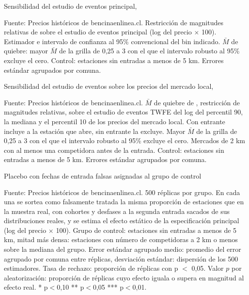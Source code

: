 \begin{table}[htbp]
    \centering
    \caption{Sensibilidad del estudio de eventos principal, \textcite{RAMBACHAN2023}} \label{tab:honest_principal}
    
    \caption*{\footnotesize Fuente: Precios históricos de bencinaenlinea.cl. Restricción de magnitudes relativas de \textcite{RAMBACHAN2023} sobre el estudio de eventos principal (log del precio $\times$ 100). Estimador e intervalo de confianza al 95\% convencional del bin indicado. $\bar{M}$ de quiebre: mayor $\bar{M}$ de la grilla de 0,25 a 3 con el que el intervalo robusto al 95\% excluye el cero. Control: estaciones sin entradas a menos de 5 km. Errores estándar agrupados por comuna.}
\end{table}

\begin{table}[htbp]
    \centering
    \caption{Sensibilidad del estudio de eventos sobre los precios del mercado local, \textcite{RAMBACHAN2023}} \label{tab:honest_mercado}
    \ajustar{}
    \caption*{\footnotesize Fuente: Precios históricos de bencinaenlinea.cl. $\bar{M}$ de quiebre de \textcite{RAMBACHAN2023}, restricción de magnitudes relativas, sobre el estudio de eventos TWFE del log del percentil 90, la mediana y el percentil 10 de los precios del mercado local. Con entrante incluye a la estación que abre, sin entrante la excluye. Mayor $\bar{M}$ de la grilla de 0,25 a 3 con el que el intervalo robusto al 95\% excluye el cero. Mercados de 2 km con al menos una competidora antes de la entrada. Control: estaciones sin entradas a menos de 5 km. Errores estándar agrupados por comuna.}
\end{table}

\begin{table}[htbp]
    \centering
    \caption{Placebo con fechas de entrada falsas asignadas al grupo de control} \label{tab:placebo_controles}
    \ajustar{}
    \caption*{\footnotesize Fuente: Precios históricos de bencinaenlinea.cl. 500 réplicas por grupo. En cada una se sortea como falsamente tratada la misma proporción de estaciones que en la muestra real, con cohortes y desfases a la segunda entrada sacados de sus distribuciones reales, y se estima el efecto estático de la especificación principal (log del precio $\times$ 100). Grupo de control: estaciones sin entradas a menos de 5 km, mitad más densa: estaciones con número de competidoras a 2 km o menos sobre la mediana del grupo. Error estándar agrupado medio: promedio del error agrupado por comuna entre réplicas, desviación estándar: dispersión de los 500 estimadores. Tasa de rechazo: proporción de réplicas con p $<$ 0,05. Valor $p$ por aleatorización: proporción de réplicas cuyo efecto iguala o supera en magnitud al efecto real. * p$<$0,10 ** p$<$0,05 *** p$<$0,01.}
\end{table}

